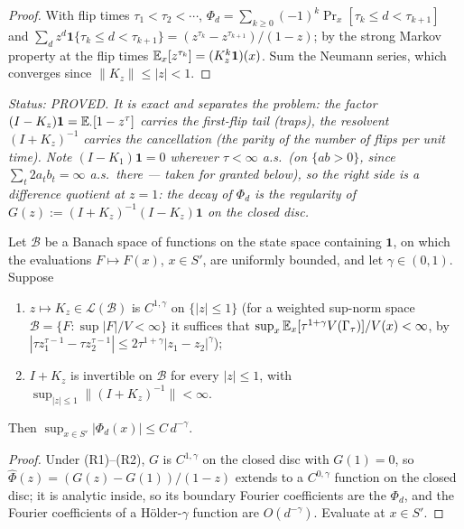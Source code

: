\begin{proof}
With flip times $\tau_1<\tau_2<\cdots$, $\Phi_d=\sum_{k\ge0}(-1)^k
\Pr_x[\tau_k\le d<\tau_{k+1}]$ and
$\sum_dz^d\mathbf 1\{\tau_k\le d<\tau_{k+1}\}=(z^{\tau_k}-z^{\tau_{k+1}})/(1-z)$;
by the strong Markov property at the flip times
$\mathbb{E}_x[z^{\tau_k}]=(K_z^k\mathbf 1)(x)$.  Sum the Neumann series, which
converges since $\|K_z\|\le|z|<1$.
\end{proof}

\emph{Status: PROVED.  It is exact and separates the problem: the
factor $(I-K_z)\mathbf 1=\mathbb{E}_\cdot[1-z^{\tau}]$ carries the first-flip
tail (traps), the resolvent $(I+K_z)^{-1}$ carries the cancellation
(the parity of the number of flips per unit time).  Note
$(I-K_1)\mathbf 1=0$ wherever $\tau<\infty$ a.s.\ (on $\{ab>0\}$, since
$\sum_t2a_tb_t=\infty$ a.s.\ there --- taken for granted below), so the
right side is a difference quotient at $z=1$: the decay of $\Phi_d$ is the regularity of
$G(z):=(I+K_z)^{-1}(I-K_z)\mathbf 1$ on the closed disc.}

\begin{proposition}\label{prop:condecay}
Let $\mathcal B$ be a Banach space of functions on the state space
containing $\mathbf 1$, on which the evaluations $F\mapsto F(x)$,
$x\in S'$, are uniformly bounded, and let $\gamma\in(0,1)$.  Suppose
\begin{enumerate}[leftmargin=2em]
\item[(R1)] $z\mapsto K_z\in\mathcal L(\mathcal B)$ is $C^{1,\gamma}$
on $\{|z|\le1\}$ (for a weighted sup-norm space
$\mathcal B=\{F:\sup|F|/V<\infty\}$ it suffices that
$\sup_x\mathbb{E}_x[\tau^{1+\gamma}V(\Gamma_\tau)]/V(x)<\infty$, by
$|\tau z_1^{\tau-1}-\tau z_2^{\tau-1}|\le2\tau^{1+\gamma}|z_1-z_2|^\gamma$);
\item[(R2)] $I+K_z$ is invertible on $\mathcal B$ for every $|z|\le1$,
with $\sup_{|z|\le1}\|(I+K_z)^{-1}\|<\infty$.
\end{enumerate}
Then $\sup_{x\in S'}|\Phi_d(x)|\le C\,d^{-\gamma}$.
\end{proposition}

\begin{proof}
Under (R1)--(R2), $G$ is $C^{1,\gamma}$ on the closed disc with
$G(1)=0$, so $\hat\Phi(z)=(G(z)-G(1))/(1-z)$ extends to a
$C^{0,\gamma}$ function on the closed disc; it is analytic inside, so
its boundary Fourier coefficients are the $\Phi_d$, and the Fourier
coefficients of a H\"older-$\gamma$ function are $O(d^{-\gamma})$.
Evaluate at $x\in S'$.
\end{proof}


